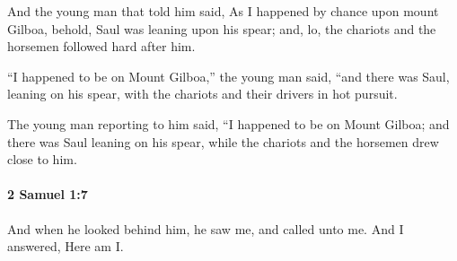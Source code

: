 			\begin{versebox}
					\item[BHS] 
					\item[ASV] And the young man that told him said, As I happened by chance upon mount Gilboa, behold, Saul was leaning upon his spear; and, lo, the chariots and the horsemen followed hard after him.
					\item[NIV] “I happened to be on Mount Gilboa,” the young man said, “and there was Saul, leaning on his spear, with the chariots and their drivers in hot pursuit.
					\item[NRSV] The young man reporting to him said, “I happened to be on Mount Gilboa; and there was Saul leaning on his spear, while the chariots and the horsemen drew close to him.
			\end{versebox}

		\paragraph{2 Samuel 1:7} %
			\label{2SAMUEL-1-7}

			And when he looked behind him, he saw me, and called unto me. And I answered, Here am I.

